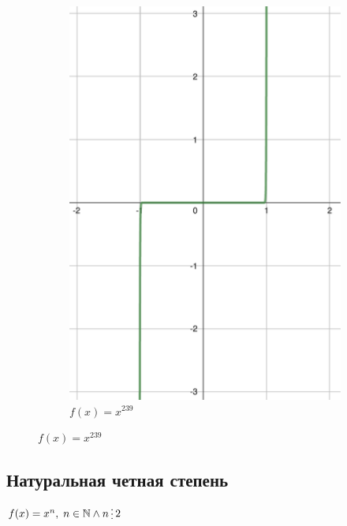 \begin{figure}[h]
\begin{subfigure}{0.35\textwidth}
        \includegraphics[width=\textwidth]{tex/chapter_1/assets/y=x^239.pdf}
        \caption*{$f(x) = x^{239}$}
    \end{subfigure}
\end{figure}


\subsection{Натуральная четная степень}

$f(x) = x^n, \; n \in \mathbb{N}  \land n \divisible 2$

